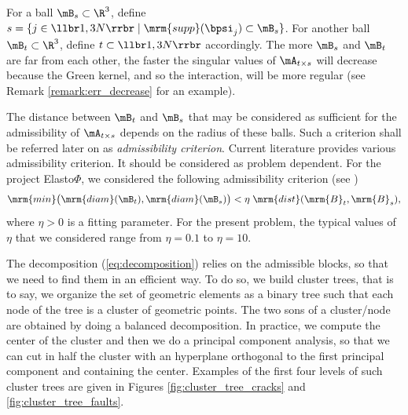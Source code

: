 For a ball $\mB_{s}\subset \R^{3}$, define $s = \{j \in\llbr 1,3N\rrbr\;\vert \;\mrm{supp}(\bpsi_{j})\subset \mB_{s}\}$. 
For another ball $\mB_{t}\subset \R^{3}$, define $t\subset \llbr1,3N\rrbr$ accordingly.  
The more $\mB_{s}$ and $\mB_{t}$ are far from each other, the faster the singular values of $\mA_{t \times s}$ will decrease because the Green kernel, and so the interaction, will be more regular (see Remark \ref{remark:err_decrease} for an example).

The distance between $\mB_{t}$ and $\mB_{s}$ that may be considered as sufficient for the admissibility of $\mA_{t \times s}$ depends on the radius of these balls. 
Such a criterion shall be referred later on as \textit{admissibility criterion}. Current literature provides various 
admissibility criterion. It should be considered as problem dependent. For the project Elasto$\Phi$, we considered the 
following admissibility criterion (see \cite{Rjasanow2007})
\begin{equation}\label{AdmissibilityCondition}
\mrm{min}\big( \mrm{diam}(\mB_{t}),\mrm{diam}(\mB_{s})\big)< \eta\;\mrm{dist}(\mrm{B}_{t},\mrm{B}_{s}),
\end{equation}
where $\eta>0$ is a fitting parameter. For the present problem, the typical values of $\eta$ that we considered  
range from $\eta = 0.1$ to $\eta = 10$. 

The decomposition (\ref{eq:decomposition}) relies on the admissible blocks, so that we need to find them in an efficient way. To do so, we build cluster trees, that is to say, we organize the set of geometric elements as a binary tree such that each node of the tree is a cluster of geometric points. The two sons of a cluster/node are obtained by doing a balanced decomposition. In practice, we compute the center of the cluster and then we do a principal component analysis, so that we can cut in half the cluster with an hyperplane orthogonal to the first principal component and containing the center. Examples of the first four levels of such cluster trees are given in Figures \ref{fig:cluster_tree_cracks} and \ref{fig:cluster_tree_faults}.


